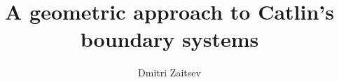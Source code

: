 \documentclass[12pt]{amsart}
\begin{document}

\def\1#1{\overline{#1}}
\def\2#1{\widetilde{#1}}
\def\3#1{\widehat{#1}}
\def\4#1{\mathbb{#1}}
\def\5#1{\frak{#1}}
\def\6#1{{\mathcal{#1}}}

\def\C{{\4C}}
\def\R{{\4R}}
\def\N{{\4N}}
\def\Z{{\4Z}}

\title[]{A geometric approach to Catlin's boundary systems}
\author[D. Zaitsev]{Dmitri Zaitsev}
\address{D. Zaitsev: School of Mathematics, Trinity College Dublin, Dublin 2, Ireland}

\maketitle
\tableofcontents


\def\Label#1{\label{#1}{\bf (#1)}~}




\def\cn{{\C^n}}
\def\cnn{{\C^{n'}}}
\def\ocn{\2{\C^n}}
\def\ocnn{\2{\C^{n'}}}


\def\dist{{\rm dist}}
\def\const{{\rm const}}
\def\rk{{\rm rank\,}}
\def\id{{\sf id}}
\def\aut{{\sf aut}}
\def\Aut{{\sf Aut}}
\def\CR{{\rm CR}}
\def\GL{{\sf GL}}
\def\Re{{\sf Re}\,}
\def\Im{{\sf Im}\,}
\def\span{\text{\rm span}}


\def\codim{{\rm codim}}
\def\crd{\dim_{{\rm CR}}}
\def\crc{{\rm codim_{CR}}}

\def\phi{\varphi}
\def\e{\varepsilon}
\def\eps{\varepsilon}
\def\d{\partial}
\def\a{\alpha}
\def\b{\beta}
\def\g{\gamma}
\def\G{\Gamma}
\def\D{\Delta}
\def\Om{\Omega}
\def\k{\kappa}
\def\l{\lambda}
\def\L{\Lambda}
\def\z{{\bar z}}
\def\w{{\bar w}}
\def\Z{{\1Z}}
\def\t{\tau}
\def\th{\theta}
\def\p{\phi}
\def\de{\delta}
\def\la{\langle}
\def\ra{\rangle}
\def\r{\rho}

\frenchspacing

\newtheorem{Thm}{Theorem}[section]
\newtheorem{Cor}[Thm]{Corollary}
\newtheorem{Pro}[Thm]{Proposition}
\newtheorem{Lem}[Thm]{Lemma}

\theoremstyle{definition}\newtheorem{Def}[Thm]{Definition}

\theoremstyle{remark}
\newtheorem{Rem}[Thm]{Remark}
\newtheorem{Exa}[Thm]{Example}
\newtheorem{Exs}[Thm]{Examples}
\end{document}
